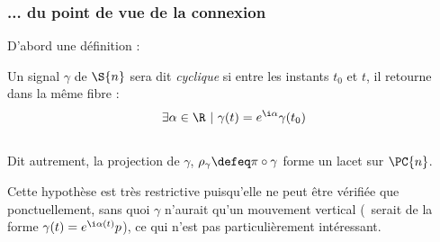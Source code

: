 \subsubsection{... du point de vue de la connexion} \label{subsec:phase_g2cycl}

D'abord une définition :

\begin{definition} \label{def:traj_cycl}
Un signal $\gamma$ de $\S{n}$ sera dit \emph{cyclique} si entre les instants $t_0$ et $t$, il retourne dans la même fibre :
\begin{equation}\label{eq:def2cycl}
	\exists \alpha \in\R\ |\ \gamma(t) = e^{\i \alpha}\gamma(t_0)
\end{equation}
\\
Dit autrement, la projection de $\gamma$, $\rho_\gamma \defeq \pi\circ\gamma$ forme un lacet sur $\PC{n}$.
\end{definition}
Cette hypothèse est très restrictive puisqu'elle ne peut être vérifiée que ponctuellement, sans quoi $\gamma$ n'aurait qu'un mouvement vertical (\ie~serait de la forme $\gamma(t) = e^{\i\alpha(t)}p$), ce qui n'est pas particulièrement intéressant.
\\

